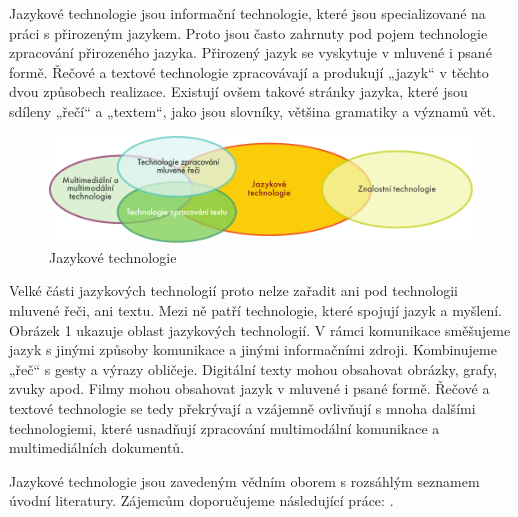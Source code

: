 \begin{multicols}{2}

Jazykové technologie jsou informační technologie, které jsou specializované na práci s přirozeným jazykem. Proto jsou často zahrnuty pod pojem technologie zpracování přirozeného jazyka. Přirozený jazyk se vyskytuje v mluvené i psané formě. Řečové a textové technologie zpracovávají a produkují „jazyk“ v těchto dvou způsobech realizace. Existují ovšem takové stránky jazyka, které jsou sdíleny „řečí“ a „textem“, jako jsou slovníky, většina gramatiky a významů vět. 
\begin{figure}[htb]
  \center
  \includegraphics[width=\textwidth]{../_media/czech/language_technologies}
  \caption{Jazykové technologie}
  \label{fig:ltincontext_de}
\end{figure}
Velké části jazykových technologií proto nelze zařadit ani pod technologii mluvené řeči, ani textu. Mezi ně patří technologie, které spojují jazyk a myšlení. Obrázek 1 ukazuje oblast jazykových technologií. V rámci komunikace směšujeme jazyk s jinými způsoby komunikace a jinými informačními zdroji. Kombinujeme „řeč“ s gesty a výrazy obličeje. Digitální texty mohou obsahovat obrázky, grafy, zvuky apod. Filmy mohou obsahovat jazyk v mluvené i psané formě. Řečové a textové technologie se tedy překrývají a vzájemně ovlivňují s mnoha dalšími technologiemi, které usnadňují zpracování multimodální komunikace a multimediálních dokumentů.

Jazykové technologie jsou zavedeným vědním oborem s rozsáhlým seznamem úvodní literatury. Zájemcům doporučujeme následující práce: \cite{carstensen-etal1, jurafsky-martin01, manning-schuetze1, lt-world1, lt-survey1}.


\end{multicols}
